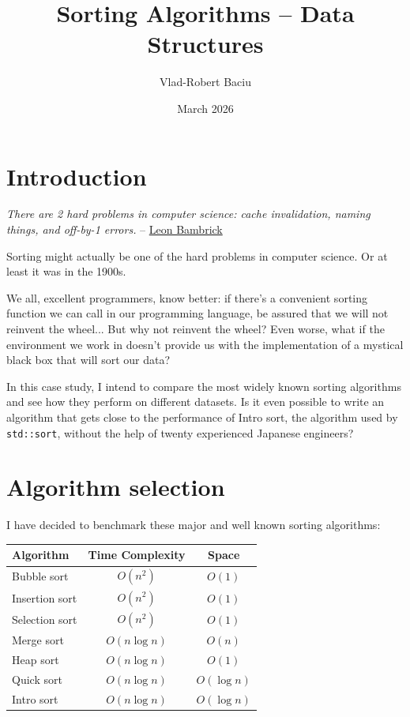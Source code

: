 \documentclass[11pt, a4paper]{article}
\title{Sorting Algorithms -- Data Structures}
\author{Vlad-Robert Baciu}
\date{March 2026}
\newcommand{\Onn}{$O(n^2)$}
\newcommand{\Onlogn}{$O(n \log n)$}
\begin{document}
\maketitle

\section{Introduction}
\textit{There are 2 hard problems in computer science: cache invalidation, naming things, and off-by-1 errors.} 
-- \href{https://twitter.com/secretGeek/status/7269997868}{Leon Bambrick}

Sorting might actually be one of the hard problems in computer science. Or at least it was in the 1900s.

We all, excellent programmers, know better: if there's a convenient sorting function we can call in our programming language, be assured that we will not reinvent the wheel... But why not reinvent the wheel? Even worse, what if the environment we work in doesn't provide us with the implementation of a mystical black box that will sort our data?

In this case study, I intend to compare the most widely known sorting algorithms and see how they perform on different datasets. Is it even possible to write an algorithm that gets close to the performance of Intro sort, the algorithm used by \texttt{std::sort}, without the help of twenty experienced Japanese engineers?


\section{Algorithm selection}
I have decided to benchmark these major and well known sorting algorithms:
\begin{center}
\setlength{\tabcolsep}{10pt}
\begin{tabular}{lcc}
    \toprule
    \textbf{Algorithm} & \textbf{Time Complexity} & \textbf{Space} \\
    \midrule
    Bubble sort       & \Onn                  & $O(1)$ \\
    Insertion sort    & \Onn                  & $O(1)$ \\
    Selection sort    & \Onn                  & $O(1)$ \\
    Merge sort        & \Onlogn               & $O(n)$ \\
    Heap sort         & \Onlogn               & $O(1)$ \\
    Quick sort        & \Onlogn               & $O(\log n)$ \\
    Intro sort        & \Onlogn               & $O(\log n)$ \\
    \bottomrule
\end{tabular}
\end{center}
\end{document}
